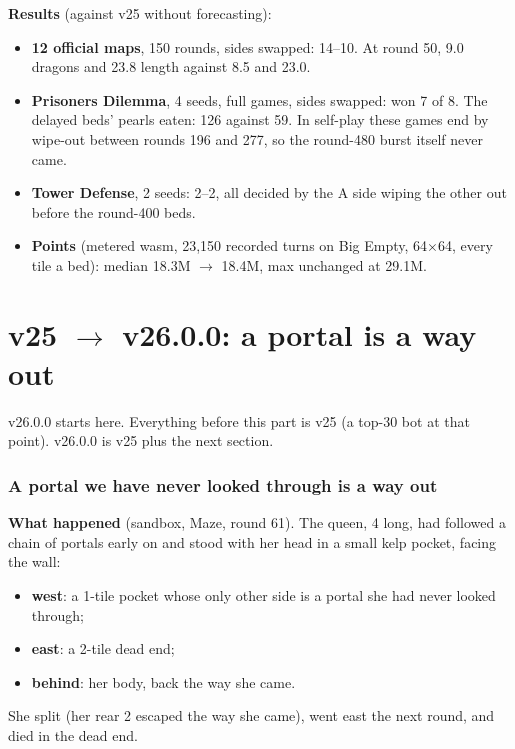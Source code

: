 \documentclass[11pt,a4paper]{article}
\begin{document}
\textbf{Results} (against v25 without forecasting):
\begin{itemize}
      \item \textbf{12 official maps}, 150 rounds, sides swapped: 14--10. At round 50, 9.0 dragons and 23.8 length against 8.5 and
            23.0.
      \item \textbf{Prisoners Dilemma}, 4 seeds, full games, sides swapped: won 7 of 8. The delayed beds' pearls eaten: 126 against
            59. In self-play these games end by wipe-out between rounds 196 and 277, so the round-480 burst itself never came.
      \item \textbf{Tower Defense}, 2 seeds: 2--2, all decided by the A side wiping the other out before the round-400 beds.
      \item \textbf{Points} (metered wasm, 23,150 recorded turns on Big Empty, 64$\times$64, every tile a bed): median 18.3M
            $\rightarrow$ 18.4M, max unchanged at 29.1M.
\end{itemize}


\part{v25 $\rightarrow$ v26.0.0: a portal is a way out}
v26.0.0 starts here. Everything before this part is v25 (a top-30 bot at that point). v26.0.0 is v25 plus the next section.

\section{A portal we have never looked through is a way out}\label{sec:door}
\textbf{What happened} (sandbox, Maze, round 61). The queen, 4 long, had followed a chain of portals early on and stood with her
head in a small kelp pocket, facing the wall:
\begin{itemize}
      \item \textbf{west}: a 1-tile pocket whose only other side is a portal she had never looked through;
      \item \textbf{east}: a 2-tile dead end;
      \item \textbf{behind}: her body, back the way she came.
\end{itemize}
She split (her rear 2 escaped the way she came), went east the next round, and died in the dead end.
\end{document}
